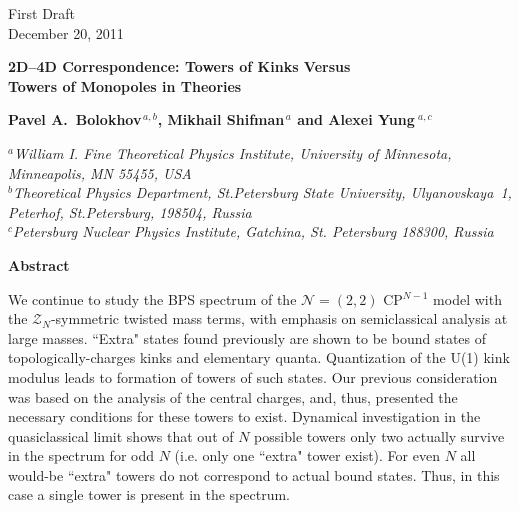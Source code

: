 \documentclass[epsfig,12pt]{article}
\newcommand{\mc}[1]{\mathcal{#1}}
\begin{document}



\begin{titlepage}

\begin{flushright}
First Draft\\
%
December 20, 2011
\end{flushright}

\vspace{0.3cm}

\begin{center}
{  \Large \bf  
			2D--4D Correspondence: Towers of Kinks Versus\\[1mm]  
			Towers of Monopoles
			in  Theories
			
}
\end{center}
\vspace{0.6cm}

\begin{center}

 {\large
 \bf   Pavel A.~Bolokhov$^{\,a,b}$,  Mikhail Shifman$^{\,a}$ and \bf Alexei Yung$^{\,\,a,c}$}
\end {center}

\begin{center}

$^a${\it  William I. Fine Theoretical Physics Institute, University of Minnesota,
Minneapolis, MN 55455, USA}\\
$^b${\it Theoretical Physics Department, St.Petersburg State University, Ulyanovskaya~1, 
	 Peterhof, St.Petersburg, 198504, Russia}\\
$^{c}${\it Petersburg Nuclear Physics Institute, Gatchina, St. Petersburg
188300, Russia
}
\end{center}


\vspace{0.7cm}


\begin{center}
{\large\bf Abstract}
\end{center}
	We continue to study the  BPS spectrum of the ${\mathcal N}=(2,2)$ CP$^{N-1}$ model  with 
	the $ \mc{Z}_N $-symmetric twisted mass terms,
	with emphasis  on  semiclassical analysis at large masses.
	``Extra" states found previously \cite{Bolokhov:2011mp} are shown to be bound states of topologically-charges kinks and elementary quanta.
	Quantization of the U(1) kink modulus leads to formation of towers of such states. 
	Our previous consideration was based on the analysis of the central charges, and, thus, 
	presented the necessary conditions for these towers to exist. 
	Dynamical investigation in the quasiclassical limit shows that out of $N$ possible towers  
	only two actually survive in the spectrum for odd $ N $ (i.e. only one ``extra" tower exist). 
	For even $ N $ all would-be ``extra" towers do not correspond to actual bound states. 
	Thus,  in this case a single tower is present in the spectrum.
	 

\end{titlepage}
\end{document}
